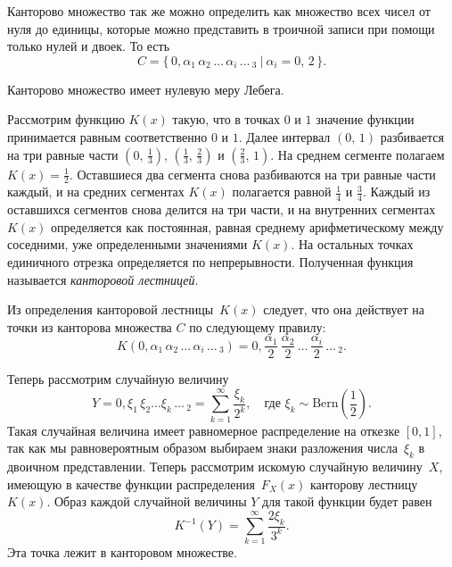 \begin{remark}
        Канторово множество так же можно определить как множество всех чисел от нуля до единицы, которые можно представить в троичной записи при помощи только нулей и двоек. То есть
        $$
                C = \{\,0,\alpha_1\,\alpha_2\,\ldots\,\alpha_i\,\ldots\,_3\:|\:\alpha_i=0,\,2\,\}.
        $$
\end{remark}

\begin{assertion}
        Канторово множество имеет нулевую меру Лебега. \cite{shiryaev}
\end{assertion}

\begin{definition}
        Рассмотрим функцию $K(x)$ такую, что в точках $0$ и $1$ значение функции принимается равным соответственно $0$ и $1$.
        Далее интервал $(0,\,1)$ разбивается на три равные части $\left(0,\,\frac {1}{3}\right)$, $\left(\frac{1}{3},\,\frac {2}{3}\right)$ и $\left(\frac{2}{3},\,1\right)$.
        На среднем сегменте полагаем $K(x)=\frac{1}{2}$.
        Оставшиеся два сегмента снова разбиваются на три равные части каждый, и на средних сегментах $K(x)$ полагается равной $\frac{1}{4}$ и $\frac{3}{4}$.
        Каждый из оставшихся сегментов снова делится на три части, и на внутренних сегментах $K(x)$ определяется как постоянная, равная среднему арифметическому между соседними, уже определенными значениями $K(x)$.
        На остальных точках единичного отрезка определяется по непрерывности.
        Полученная функция называется \textit{канторовой лестницей}. 
\end{definition}

\begin{remark}
        Из определения канторовой лестницы~$K(x)$ следует, что она действует на точки из канторова множества $C$ по следующему правилу:
        $$
                K(0,\alpha_1\,\alpha_2\,\ldots\,\alpha_i\,\ldots\,_3) =
                0,\frac{\alpha_1}2\,\frac{\alpha_2}2\,\ldots\,\frac{\alpha_i}2\,\ldots\,_2.
        $$
\end{remark}

Теперь рассмотрим случайную величину 
$$
        Y =
        0, \xi_1\,\xi_2\ldots\xi_k\,\ldots\,_2 =
        \sum_{k=1}^{\infty}\frac{\xi_k}{2^k},
        \quad
        \mbox{где $\xi_k \sim\mbox{Bern}\left(\frac12\right)$}.
$$
Такая случайная величина имеет равномерное распределение на откезке $[0,1]$, так как мы равновероятным образом выбираем знаки разложения числа~$\xi_k$ в двоичном представлении. Теперь рассмотрим искомую случайную величину~$X$, имеющую в качестве функции распределения~$F_X(x)$ канторову лестницу~$K(x)$. Образ каждой случайной величины $Y$ для такой функции будет равен
$$
        K^{-1}(Y) = \sum_{k=1}^{\infty}\frac{2\xi_k}{3^k}.
$$
Эта точка лежит в канторовом множестве.

